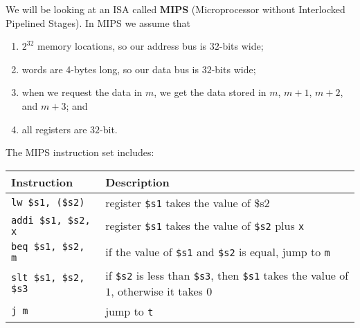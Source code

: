 \begin{example}[MIPS]
    We will be looking at an ISA called \textbf{MIPS} (Microprocessor without Interlocked Pipelined Stages). In MIPS we assume that
    \begin{enumerate}
        \item $2^32$ memory locations, so our address bus is $32$-bits wide;
        \item words are 4-bytes long, so our data bus is $32$-bits wide;
        \item when we request the data in $m$, we get the data stored in $m$, $m+1$, $m+2$, and $m + 3$; and
        \item all registers are $32$-bit.
    \end{enumerate}
    The MIPS instruction set includes:
    \begin{center}
        \begin{tabular}{lp{20em}}
            \toprule
            Instruction & Description \\
            \midrule
            \texttt{lw \$s1, (\$s2)} & register \texttt{\$s1} takes the value of \$s2 \\
            \texttt{addi \$s1, \$s2, x} & register \texttt{\$s1} takes the value of \texttt{\$s2} plus \texttt{x} \\
            \texttt{beq \$s1, \$s2, m} & if the value of \texttt{\$s1} and \texttt{\$s2} is equal, jump to \texttt{m} \\
            \texttt{slt \$s1, \$s2, \$s3} & if \texttt{\$s2} is less than \texttt{\$s3}, then \texttt{\$s1} takes the value of $1$, otherwise it takes $0$ \\
            \texttt{j m} & jump to \texttt{t} \\
            \bottomrule
        \end{tabular}
    \end{center}
\end{example}

